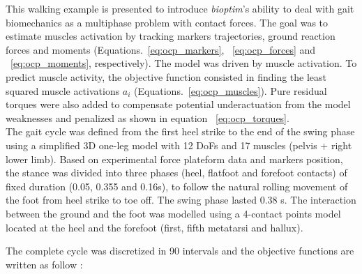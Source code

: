 This walking example is presented to introduce \textit{bioptim}'s ability to deal with gait biomechanics as a multiphase problem with contact forces.
The goal was to estimate muscles activation by tracking markers trajectories, ground reaction forces and moments (Equations.~\ref{eq:ocp_markers}, ~\ref{eq:ocp_forces} and ~\ref{eq:ocp_moments}, respectively). 
The model was driven by muscle activation. 
To predict muscle activity, the objective function consisted in finding the least squared muscle activations $a_{i}$ (Equations.~\ref{eq:ocp_muscles}). 
Pure residual torques were also added to compensate potential underactuation from the model weaknesses and penalized as shown in equation ~\ref{eq:ocp_torques}.\\
The gait cycle was defined from the first heel strike to the end of the swing phase using a simplified 3D one-leg model with 12 DoFs and 17 muscles (pelvis + right lower limb). 
Based on experimental force plateform data and markers position, the stance was divided into three phases (heel, flatfoot and forefoot contacts) of fixed duration (0.05, 0.355 and 0.16s), to follow the natural rolling movement of the foot from heel strike to toe off.
The swing phase lasted 0.38 s. 
The interaction between the ground and the foot was modelled using a 4-contact points model located at the heel and the forefoot (first, fifth metatarsi and hallux).

The complete cycle was discretized in 90 intervals and the objective functions are written as follow :\\


